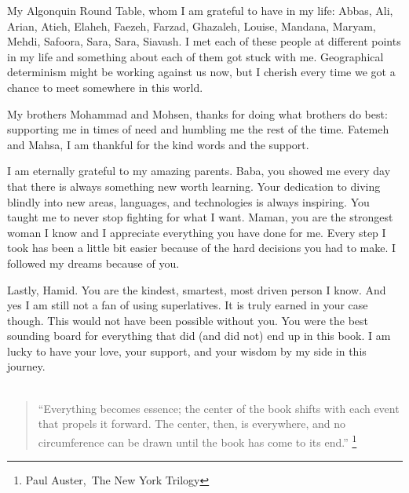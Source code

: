 {%
My Algonquin Round Table, whom I am grateful to have in my life:
Abbas, Ali, Arian, Atieh, Elaheh, Faezeh, Farzad, Ghazaleh, Louise, Mandana, Maryam, Mehdi, Safoora, Sara, Sara, Siavash. 
I met each of these people at different points in my life and something about each of them got stuck with me. Geographical determinism might be working against us now, but I cherish every time we got a chance to meet somewhere in this world. 

My brothers Mohammad and Mohsen, thanks for doing what brothers do best: supporting me in times of need and humbling me the rest of the time. Fatemeh and Mahsa, I am thankful for the kind words and the support.

I am eternally grateful to my amazing parents. 
Baba, you showed me every day that there is always something new worth learning. 
Your dedication to diving blindly into new areas, languages, and technologies is always inspiring.
You taught me to never stop fighting for what I want. 
Maman, you are the strongest woman I know and I appreciate everything you have done for me.
Every step I took has been a little bit easier because of the hard decisions you had to make. 
I followed my dreams because of you.


Lastly, Hamid. 
You are the kindest, smartest, most driven person I know. 
And yes I am still not a fan of using superlatives. 
It is truly earned in your case though.
This would not have been possible without you. 
You were the best sounding board for everything that did (and did not) end up in this book.
I am lucky to have your love, your support, and your wisdom by my side in this journey. 
\\
\\

\vfill

\begin{quote}
{``Everything becomes essence; the center of the book shifts with each event that propels it forward. The center, then, is everywhere, and no circumference can be drawn until the book has come to its end.'' \footnote{Paul Auster, The New York Trilogy}}
\end{quote}

\clearpage
}

\blankpage
